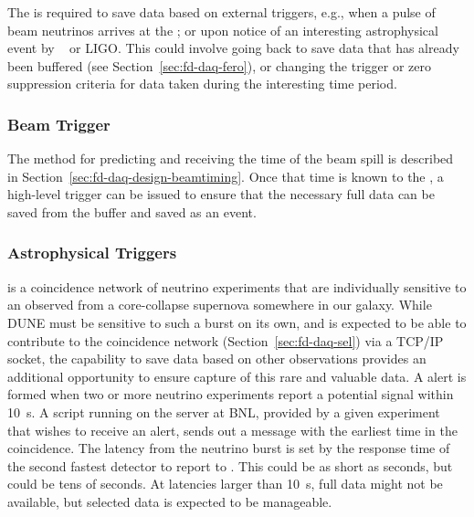 The  is required to save data based on external triggers, e.g., when a pulse of beam neutrinos  arrives at the ; or upon notice of an interesting astrophysical event by ~\cite{snews} or LIGO. This could involve going back %
to save data that has already been buffered (see Section~\ref{sec:fd-daq-fero}), or changing the trigger or zero suppression criteria for data taken during the interesting time period.

\subsubsection{Beam Trigger} 

The method for predicting and receiving the time of the beam spill is described in
Section~\ref{sec:fd-daq-design-beamtiming}.
Once that time is known to the , a high-level trigger can be issued
to ensure that the necessary full data can be saved from the buffer
and saved as an event.

\subsubsection{Astrophysical Triggers} 

 is a coincidence
network of neutrino experiments that are individually sensitive to
an  %
observed from a core-collapse
supernova somewhere in our galaxy.
While DUNE must be sensitive to such a burst on its own, and %
is expected to be able to contribute to the coincidence network (Section~\ref{sec:fd-daq-sel}) via a TCP/IP socket, the capability to save data based on other observations provides an additional opportunity to ensure capture of this rare and valuable data. 
A  alert is formed when two or more neutrino experiments
report a potential  signal within \SI{10}{\s}.
A script running on the  server at BNL, provided by a given experiment that wishes to receive an alert,  sends out a message with the earliest time in the coincidence.
The latency from the neutrino burst is set by the response time of the
second fastest detector to report to . This could be as
short as seconds, but could be tens of seconds.
At latencies larger than \SI{10}{\s}, full data might not be
available, but selected data is expected to be manageable. 

